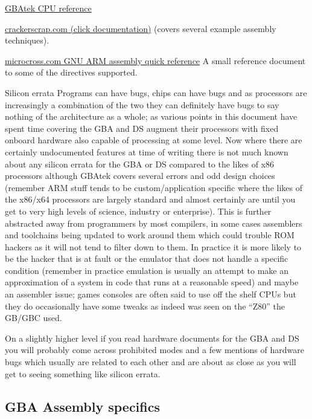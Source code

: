 \documentclass[
]{book}
\begin{document}
\href{http://problemkaputt.de/gbatek.htm\#cpuoverview}{GBAtek CPU reference}

\href{https://web.archive.org/web/20100606044629/http://crackerscrap.com/docs.php}{crackerscrap.com (click documentation)} (covers several example assembly techniques).

\href{http://microcross.com/GNU-ARM-Assy-Quick-Ref.pdf}{microcross.com GNU ARM assembly quick reference} A small reference document to some of the directives supported.

Silicon errata Programs can have bugs, chips can have bugs and as processors are increasingly a combination of the two they can definitely have bugs to say nothing of the architecture as a whole; as various points in this document have spent time covering the GBA and DS augment their processors with fixed onboard hardware also capable of processing at some level. Now where there are certainly undocumented features at time of writing there is not much known about any silicon errata for the GBA or DS compared to the likes of x86 processors although GBAtek covers several errors and odd design choices (remember ARM stuff tends to be custom/application specific where the likes of the x86/x64 processors are largely standard and almost certainly are until you get to very high levels of science, industry or enterprise). This is further abstracted away from programmers by most compilers, in some cases assemblers and toolchains being updated to work around them which could trouble ROM hackers as it will not tend to filter down to them. In practice it is more likely to be the hacker that is at fault or the emulator that does not handle a specific condition (remember in practice emulation is usually an attempt to make an approximation of a system in code that runs at a reasonable speed) and maybe an assembler issue; games consoles are often said to use off the shelf CPUs but they do occasionally have some tweaks as indeed was seen on the ``Z80'' the GB/GBC used.

On a slightly higher level if you read hardware documents for the GBA and DS you will probably come across prohibited modes and a few mentions of hardware bugs which usually are related to each other and are about as close as you will get to seeing something like silicon errata.

\hypertarget{gba-assembly-specifics}{%
\subsection{GBA Assembly specifics}\label{gba-assembly-specifics}}
\end{document}
